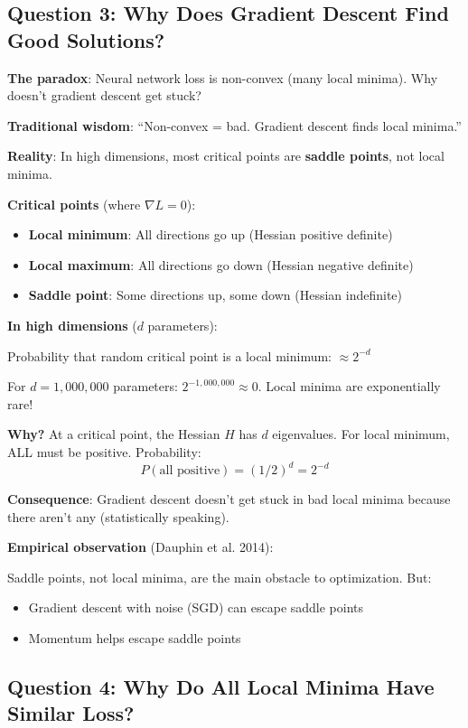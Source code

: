 \documentclass[11pt,oneside]{book}
\begin{document}
\subsection{Question 3: Why Does Gradient Descent Find Good Solutions?}

\textbf{The paradox}: Neural network loss is non-convex (many local minima). Why doesn't gradient descent get stuck?

\textbf{Traditional wisdom}: ``Non-convex = bad. Gradient descent finds local minima.''

\textbf{Reality}: In high dimensions, most critical points are \textbf{saddle points}, not local minima.

\textbf{Critical points} (where $\nabla L = 0$):
\begin{itemize}
\item \textbf{Local minimum}: All directions go up (Hessian positive definite)
\item \textbf{Local maximum}: All directions go down (Hessian negative definite)
\item \textbf{Saddle point}: Some directions up, some down (Hessian indefinite)
\end{itemize}

\textbf{In high dimensions} ($d$ parameters):

Probability that random critical point is a local minimum: $\approx 2^{-d}$

For $d = 1{,}000{,}000$ parameters: $2^{-1{,}000{,}000} \approx 0$. Local minima are exponentially rare!

\textbf{Why?} At a critical point, the Hessian $H$ has $d$ eigenvalues. For local minimum, ALL must be positive. Probability:
\[
P(\text{all positive}) = (1/2)^d = 2^{-d}
\]

\textbf{Consequence}: Gradient descent doesn't get stuck in bad local minima because there aren't any (statistically speaking).

\textbf{Empirical observation} (Dauphin et al. 2014):

Saddle points, not local minima, are the main obstacle to optimization. But:
\begin{itemize}
\item Gradient descent with noise (SGD) can escape saddle points
\item Momentum helps escape saddle points
\end{itemize}

\subsection{Question 4: Why Do All Local Minima Have Similar Loss?}
\end{document}
